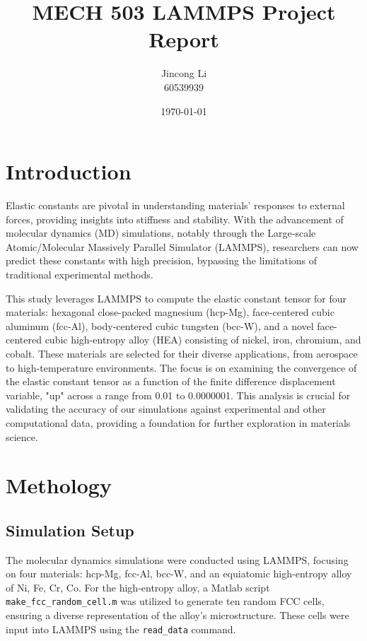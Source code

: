 \documentclass[a4paper,12pt]{article} %
\begin{document}
\setlength{\parskip}{1em} 
\setlength{\parindent}{0pt}
\newcommand{\vect}[1]{\mathbf{#1}}

\title{MECH 503 LAMMPS Project Report}
\author{Jincong Li \\ 60539939}
\date{\today}
\maketitle

\section*{Introduction}
Elastic constants are pivotal in understanding materials' responses to external forces, 
providing insights into stiffness and stability. With the advancement of molecular dynamics 
(MD) simulations, notably through the Large-scale Atomic/Molecular Massively Parallel Simulator
(LAMMPS), researchers can now predict these constants with high precision, bypassing the 
limitations of traditional experimental methods.

This study leverages LAMMPS to compute the elastic constant tensor for four 
materials: hexagonal close-packed magnesium (hcp-Mg), face-centered cubic aluminum 
(fcc-Al), body-centered cubic tungsten (bcc-W), and a novel face-centered cubic 
high-entropy alloy (HEA) consisting of nickel, iron, chromium, and cobalt. 
These materials are selected for their diverse applications, from aerospace to 
high-temperature environments. The focus is on examining the convergence of
the elastic constant tensor as a function of the finite difference displacement 
variable, "up" across a range from 0.01 to 0.0000001. This analysis is crucial for
validating the accuracy of our simulations against experimental and other 
computational data, providing a foundation for further exploration in materials science.

\section*{Methology}
\subsection*{Simulation Setup}
The molecular dynamics simulations were conducted using LAMMPS, focusing on four materials: hcp-Mg, fcc-Al, bcc-W, and an equiatomic high-entropy alloy of Ni, Fe, Cr, Co. For the high-entropy alloy, a Matlab script \texttt{make\_fcc\_random\_cell.m} was utilized to generate ten random FCC cells, ensuring a diverse representation of the alloy's microstructure. These cells were input into LAMMPS using the \texttt{read\_data} command.
\end{document}
